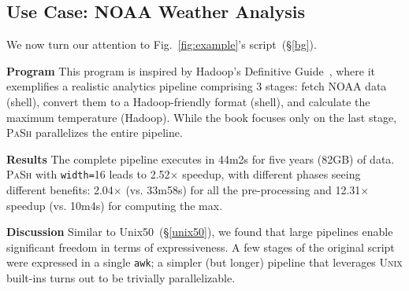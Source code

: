 \documentclass[sigplan, review, screen, anonymous]{acmart}
\newcommand{\heading}[1]{\vspace{4pt}\noindent\textbf{#1}\enspace}
\newcommand{\ttt}[1]{\texttt{#1}}
\newcommand{\todo}[1]{\hl{#1}\xspace}
\newcommand{\sx}[1]{(\S\ref{#1})}
\newcommand{\sys}{{\scshape PaSh}\xspace}
\newcommand{\unix}{{\scshape Unix}\xspace}
\begin{document}
\subsection{Use Case: NOAA Weather Analysis}
\label{macro1}

We now turn our attention to Fig.~\ref{fig:example}'s script~\sx{bg}.

\heading{Program}
This program is inspired by Hadoop's Definitive Guide~\cite[\S2]{hadoop:15}, where it exemplifies a realistic analytics pipeline comprising 3 stages:
  fetch NOAA data (shell), convert them to a Hadoop-friendly format (shell), and calculate the maximum temperature (Hadoop).
While the book focuses only on the last stage, \sys parallelizes the entire pipeline.

\heading{Results}
The complete pipeline executes in 44m2s for five years (82GB) of data.
\sys with \ttt{width=}16 leads to 2.52$\times$ speedup, with different phases seeing different benefits:
  2.04$\times$ (vs. 33m58s) for all the pre-processing and 
  12.31$\times$ speedup (vs. 10m4s) for computing the max.



\heading{Discussion}
Similar to Unix50~\sx{unix50}, we found that large pipelines enable significant freedom in terms of expressiveness.
A few stages of the original script were expressed in a single \ttt{awk};
  a simpler (but longer) pipeline that leverages \unix built-ins turns out to be trivially parallelizable.
\end{document}
